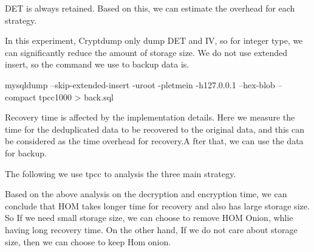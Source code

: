 DET is always retained. Based on this, we can estimate the overhead for each strategy. 



In this experiment, Cryptdump only dump DET and IV, so for integer type, we can significantly reduce the amount of storage size. We do not use extended insert, so the command we use to backup data is.


mysqldump --skip-extended-insert -uroot -pletmein -h127.0.0.1 --hex-blob --compact tpcc1000 > back.sql



Recovery time is affected by the implementation details. Here we measure the time for the deduplicated data to be recovered to the original data, and this can be considered as the time overhead for recovery.A fter that, we can use the data for backup.


The following we use tpcc to analysis the three main strategy.


Based on the above analysis on the decryption and encryption time, we can conclude that HOM takes longer time for recovery and also has large storage size. So If we need small storage size, we can choose to remove HOM Onion, whlie having long recovery time. On the other hand, If we do not care about storage size, then we can choose to keep Hom onion. 

